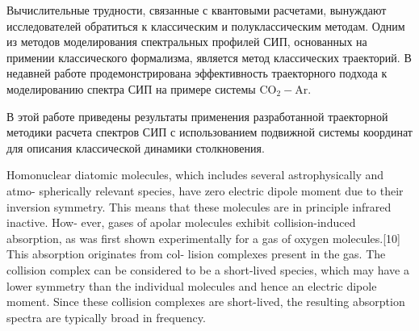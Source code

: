Вычислительные трудности, связанные с квантовыми расчетами, вынуждают исследователей обратиться к классическим и полуклассическим методам. Одним из методов моделирования спектральных профилей СИП, основанных на примении классического формализма, является метод классических траекторий. В недавней работе \cite{oparin2017} продемонстрирована эффективность траекторного подхода к моделированию спектра СИП на примере системы CO$_2-$Ar. \par
В этой работе приведены результаты применения разработанной траекторной методики расчета спектров СИП с использованием подвижной системы координат для описания классической динамики столкновения. 

\iffalse
Homonuclear diatomic molecules, which includes several astrophysically and atmo-
spherically relevant species, have zero electric dipole moment due to their inversion
symmetry. This means that these molecules are in principle infrared inactive. How-
ever, gases of apolar molecules exhibit collision-induced absorption, as was first shown
experimentally for a gas of oxygen molecules.[10] This absorption originates from col-
lision complexes present in the gas. The collision complex can be considered to be a
short-lived species, which may have a lower symmetry than the individual molecules
and hence an electric dipole moment. Since these collision complexes are short-lived,
the resulting absorption spectra are typically broad in frequency.

